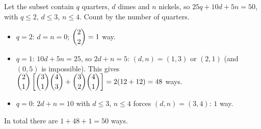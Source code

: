 Let the subset contain $q$ quarters, $d$ dimes and $n$ nickels, so $25q+10d+5n=50$, with $q\le2$, $d\le3$, $n\le4$. Count by the number of quarters.
\begin{itemize}
\item $q=2$: $d=n=0$; $\dbinom22=1$ way.
\item $q=1$: $10d+5n=25$, so $2d+n=5$: $(d,n)=(1,3)$ or $(2,1)$ (and $(0,5)$ is impossible). This gives $\dbinom21\left[\dbinom31\dbinom43+\dbinom32\dbinom41\right]=2(12+12)=48$ ways.
\item $q=0$: $2d+n=10$ with $d\le3$, $n\le4$ forces $(d,n)=(3,4)$: $1$ way.
\end{itemize}
In total there are $1+48+1=\boxed{50}$ ways.
